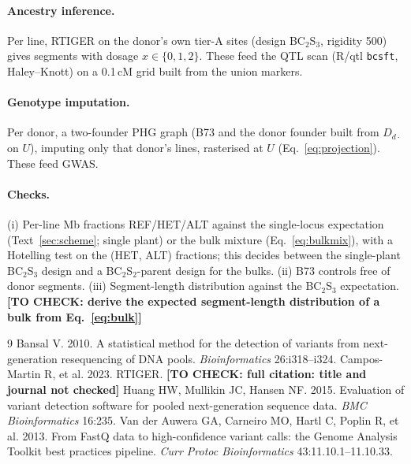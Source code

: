\documentclass[11pt]{article}
\newcommand{\code}[1]{\texttt{#1}}
\newcommand{\todo}[1]{\textbf{[TO CHECK: #1]}}
\begin{document}
\paragraph{Ancestry inference.} Per line, RTIGER \citep{campos2023rtiger} on the donor's own tier-A sites (design BC$_2$S$_3$, rigidity 500)
gives segments with dosage $x\in\{0,1,2\}$. These feed the QTL scan (R/qtl \code{bcsft}, Haley--Knott) on a 0.1\,cM grid built from the
union markers.

\paragraph{Genotype imputation.} Per donor, a two-founder PHG graph (B73 and the donor founder built from $D_{d\cdot}$ on $U$), imputing
only that donor's lines, rasterised at $U$ (Eq.~\eqref{eq:projection}). These feed GWAS.

\paragraph{Checks.} (i) Per-line Mb fractions REF/HET/ALT against the single-locus expectation (Text~\ref{sec:scheme}; single plant) or
the bulk mixture (Eq.~\eqref{eq:bulkmix}), with a Hotelling test on the (HET, ALT) fractions; this decides between the single-plant BC$_2$S$_3$
design and a BC$_2$S$_2$-parent design for the bulks. (ii) B73 controls free of donor segments. (iii) Segment-length distribution against the
BC$_2$S$_3$ expectation. \todo{derive the expected segment-length distribution of a bulk from Eq.~\eqref{eq:bulk}}


\begin{thebibliography}{9}
 Bansal V. 2010. A statistical method for the detection of variants from next-generation
resequencing of DNA pools. \textit{Bioinformatics} 26:i318--i324.
 Campos-Martin R, et al. 2023. RTIGER. \todo{full citation: title and journal not checked}
 Huang HW, Mullikin JC, Hansen NF. 2015. Evaluation of variant detection software for pooled
next-generation sequence data. \textit{BMC Bioinformatics} 16:235.
 Van der Auwera GA, Carneiro MO, Hartl C, Poplin R, et al. 2013. From FastQ data to
high-confidence variant calls: the Genome Analysis Toolkit best practices pipeline. \textit{Curr Protoc Bioinformatics} 43:11.10.1--11.10.33.
\end{thebibliography}
\end{document}
